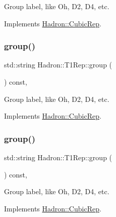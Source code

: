 Group label, like Oh, D2, D4, etc. 

Implements \mbox{\hyperlink{structHadron_1_1CubicRep_a0748f11ec87f387062c8e8981339a29c}{Hadron\+::\+Cubic\+Rep}}.

\mbox{\label{structHadron_1_1T1Rep_a92f0ff47781bd3fd98054295d9a42f3a}} 
\subsubsection{\texorpdfstring{group()}{group()}\hspace{0.1cm}{\footnotesize\ttfamily [2/3]}}
{\footnotesize\ttfamily std\+::string Hadron\+::\+T1\+Rep\+::group (\begin{DoxyParamCaption}{ }\end{DoxyParamCaption}) const\hspace{0.3cm}{\ttfamily [inline]}, {\ttfamily [virtual]}}

Group label, like Oh, D2, D4, etc. 

Implements \mbox{\hyperlink{structHadron_1_1CubicRep_a0748f11ec87f387062c8e8981339a29c}{Hadron\+::\+Cubic\+Rep}}.

\mbox{\label{structHadron_1_1T1Rep_a92f0ff47781bd3fd98054295d9a42f3a}} 
\subsubsection{\texorpdfstring{group()}{group()}\hspace{0.1cm}{\footnotesize\ttfamily [3/3]}}
{\footnotesize\ttfamily std\+::string Hadron\+::\+T1\+Rep\+::group (\begin{DoxyParamCaption}{ }\end{DoxyParamCaption}) const\hspace{0.3cm}{\ttfamily [inline]}, {\ttfamily [virtual]}}

Group label, like Oh, D2, D4, etc. 

Implements \mbox{\hyperlink{structHadron_1_1CubicRep_a0748f11ec87f387062c8e8981339a29c}{Hadron\+::\+Cubic\+Rep}}.

\mbox{\label{structHadron_1_1T1Rep_ad64cbc6c40d059a9cee94bab5f8614ce}} 
